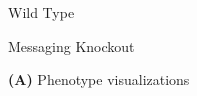 \begin{figure}[!htbp]
\begin{center}
\begin{minipage}[t]{0.5\linewidth}

\vspace{1.0ex}

\hspace*{\fill}%
\begin{minipage}[t]{0.05\linewidth}
\vspace{0pt} %
\end{minipage}%
\hfill
\begin{minipage}[t]{0.45\linewidth}
\centering
\vspace{0pt} %
Wild Type
\end{minipage}%
\hfill
\begin{minipage}[t]{0.45\linewidth}
\centering
\vspace{0pt} %
Messaging Knockout
\end{minipage}%
\hspace*{\fill}

\vspace{1.0ex}

\begin{minipage}{\linewidth}
  \textbf{(A)} Phenotype visualizations
\end{minipage}


\end{minipage}
\end{center}
\end{figure}
